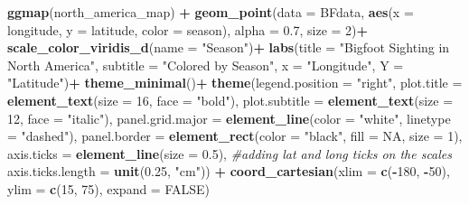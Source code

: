 \documentclass[
]{article}
\newenvironment{Shaded}{\begin{snugshade}}{\end{snugshade}}
\newcommand{\AttributeTok}[1]{\textcolor[rgb]{0.13,0.29,0.53}{#1}}
\newcommand{\CommentTok}[1]{\textcolor[rgb]{0.56,0.35,0.01}{\textit{#1}}}
\newcommand{\ConstantTok}[1]{\textcolor[rgb]{0.56,0.35,0.01}{#1}}
\newcommand{\DecValTok}[1]{\textcolor[rgb]{0.00,0.00,0.81}{#1}}
\newcommand{\FloatTok}[1]{\textcolor[rgb]{0.00,0.00,0.81}{#1}}
\newcommand{\FunctionTok}[1]{\textcolor[rgb]{0.13,0.29,0.53}{\textbf{#1}}}
\newcommand{\NormalTok}[1]{#1}
\newcommand{\SpecialCharTok}[1]{\textcolor[rgb]{0.81,0.36,0.00}{\textbf{#1}}}
\newcommand{\StringTok}[1]{\textcolor[rgb]{0.31,0.60,0.02}{#1}}
\begin{document}
\begin{Shaded}
\begin{Highlighting}[]
\FunctionTok{ggmap}\NormalTok{(north\_america\_map) }\SpecialCharTok{+}
  \FunctionTok{geom\_point}\NormalTok{(}\AttributeTok{data =}\NormalTok{ BFdata, }\FunctionTok{aes}\NormalTok{(}\AttributeTok{x =}\NormalTok{ longitude, }
                                \AttributeTok{y =}\NormalTok{ latitude,}
                                \AttributeTok{color =}\NormalTok{ season), }\AttributeTok{alpha =} \FloatTok{0.7}\NormalTok{, }\AttributeTok{size =} \DecValTok{2}\NormalTok{)}\SpecialCharTok{+}
  \FunctionTok{scale\_color\_viridis\_d}\NormalTok{(}\AttributeTok{name =} \StringTok{"Season"}\NormalTok{)}\SpecialCharTok{+}
  \FunctionTok{labs}\NormalTok{(}\AttributeTok{title =} \StringTok{"Bigfoot Sighting in North America"}\NormalTok{,}
       \AttributeTok{subtitle =} \StringTok{"Colored by Season"}\NormalTok{,}
       \AttributeTok{x =} \StringTok{"Longitude"}\NormalTok{,}
       \AttributeTok{Y =} \StringTok{"Latitude"}\NormalTok{)}\SpecialCharTok{+}
  \FunctionTok{theme\_minimal}\NormalTok{()}\SpecialCharTok{+}
  \FunctionTok{theme}\NormalTok{(}\AttributeTok{legend.position =} \StringTok{"right"}\NormalTok{,}
        \AttributeTok{plot.title =} \FunctionTok{element\_text}\NormalTok{(}\AttributeTok{size =} \DecValTok{16}\NormalTok{,}
                                  \AttributeTok{face =} \StringTok{"bold"}\NormalTok{),}
        \AttributeTok{plot.subtitle =} \FunctionTok{element\_text}\NormalTok{(}\AttributeTok{size =} \DecValTok{12}\NormalTok{,}
                                     \AttributeTok{face =} \StringTok{"italic"}\NormalTok{),}
        \AttributeTok{panel.grid.major =} \FunctionTok{element\_line}\NormalTok{(}\AttributeTok{color =} \StringTok{"white"}\NormalTok{, }
                                        \AttributeTok{linetype =} \StringTok{"dashed"}\NormalTok{),}
        \AttributeTok{panel.border =} \FunctionTok{element\_rect}\NormalTok{(}\AttributeTok{color =} \StringTok{"black"}\NormalTok{,}
                                    \AttributeTok{fill =} \ConstantTok{NA}\NormalTok{, }
                                    \AttributeTok{size =} \DecValTok{1}\NormalTok{),}
    \AttributeTok{axis.ticks =} \FunctionTok{element\_line}\NormalTok{(}\AttributeTok{size =} \FloatTok{0.5}\NormalTok{), }\CommentTok{\#adding lat and long ticks on the scales}
    \AttributeTok{axis.ticks.length =} \FunctionTok{unit}\NormalTok{(}\FloatTok{0.25}\NormalTok{, }\StringTok{"cm"}\NormalTok{)) }\SpecialCharTok{+}
  \FunctionTok{coord\_cartesian}\NormalTok{(}\AttributeTok{xlim =} \FunctionTok{c}\NormalTok{(}\SpecialCharTok{{-}}\DecValTok{180}\NormalTok{, }\SpecialCharTok{{-}}\DecValTok{50}\NormalTok{), }
                  \AttributeTok{ylim =} \FunctionTok{c}\NormalTok{(}\DecValTok{15}\NormalTok{, }\DecValTok{75}\NormalTok{), }\AttributeTok{expand =} \ConstantTok{FALSE}\NormalTok{)}
\end{Highlighting}
\end{Shaded}
\end{document}
